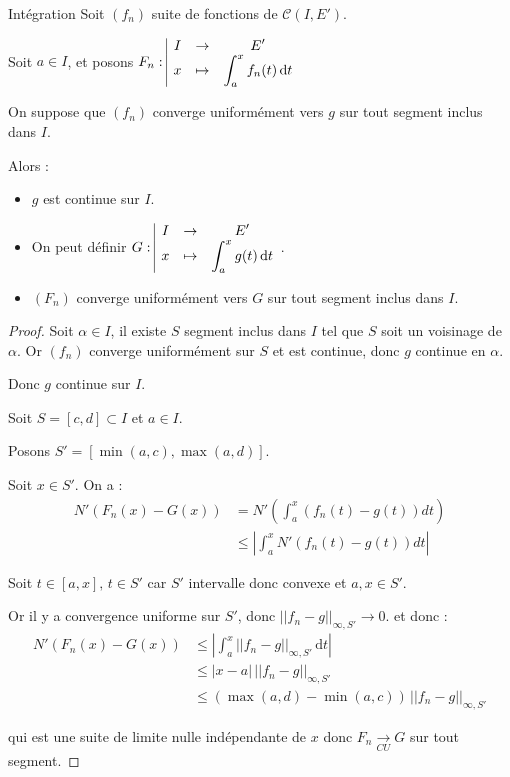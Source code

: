 \begin{theoreme}{Intégration}{}
    Soit $(f_n)$ suite de fonctions de $\mathscr C (I, E')$.

    Soit $a \in I$, et posons $F_n: \space \begin{array}{|ccc} \displaystyle I & \to & \displaystyle E' \\ \displaystyle x & \mapsto & \displaystyle \int_a^x f_n(t) \,\mathrm{d}t \end{array}$

    On suppose que $(f_n)$ converge uniformément vers $g$ 
    sur tout segment inclus dans $I$.

    Alors : 
    \begin{itemize}
        \item $g$ est continue sur $I$.
        \item On peut définir $G: \space \begin{array}{|ccc} \displaystyle I & \to & \displaystyle E' \\ \displaystyle x & \mapsto & \displaystyle \int_a^x g(t) \,\mathrm{d}t \end{array}$.
        \item $(F_n)$ converge uniformément vers $G$ sur tout segment inclus dans $I$.
    \end{itemize}
\end{theoreme}


\begin{proof}
    Soit $\alpha \in I$, il existe $S$ segment inclus dans $I$ tel que $S$ soit un voisinage de $\alpha$. Or 
    $(f_n)$ converge uniformément sur $S$ et est continue, donc $g$ continue en $\alpha$. 

    Donc $g$ continue sur $I$.

    \lvspace Soit $S = [c, d] \subset I$ et $a \in I$. 
    
    Posons $S' = [\min(a, c), \max(a, d)]$.

    Soit $x \in S'$. On a :
    \begin{align*}
        N'(F_n(x) - G(x)) & = N'\left( \int_a^x (f_n(t) - g(t)) dt \right) \\
        & \leqslant \left| \int_{a}^x N'(f_n(t) - g(t)) dt \right|
    \end{align*}

    Soit $t \in [a, x], \, t \in S'$ car $S'$ intervalle donc convexe et $a, x \in S'$. 

    Or il y a convergence uniforme sur $S'$, donc $||f_n - g||_{\infty, S'} \to 0$.
    et donc :
    \begin{equation*}
    \begin{aligned}
        N'(F_n(x) - G(x)) & \leqslant \left| \int_{a}^{x} ||f_n - g||_{\infty, S'} \,\mathrm{d}t \right| \\
        & \leqslant |x - a| \, ||f_n - g||_{\infty, S'} \\
        & \leqslant (\max(a, d) - \min(a, c)) \, ||f_n - g||_{\infty, S'}
    \end{aligned}
    \end{equation*}

    qui est une suite de limite nulle indépendante de $x$ donc $F_n \xrightarrow[CU]{} G$ sur tout segment. 
\end{proof}

